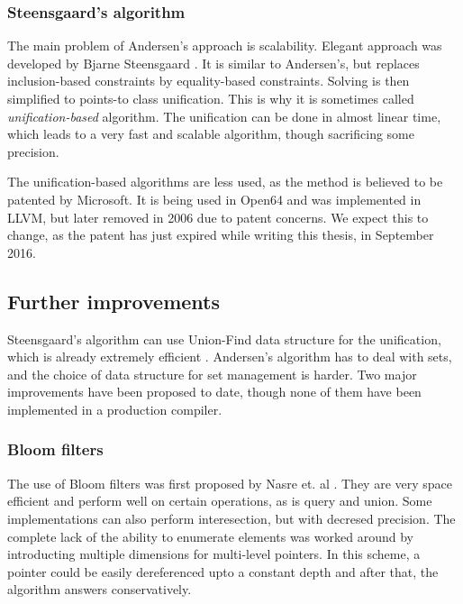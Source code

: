 \subsubsection{Steensgaard's algorithm}

The main problem of Andersen's approach is scalability. 
Elegant approach was developed by Bjarne Steensgaard \cite{Steensgaard96}. 
It is similar to Andersen's, but replaces inclusion-based constraints by
equality-based constraints. Solving is then simplified to points-to class
unification. This is why it is sometimes called {\it unification-based}
algorithm. The unification can be done in almost linear time, which leads to a
very fast and scalable algorithm, though sacrificing some precision.

The unification-based algorithms are less used, as the method is
believed to be patented by Microsoft\cite{patent:steensgaard}. It is being used
in Open64 and was implemented in LLVM, but later removed in 2006
\cite{LLVM:DSA:Remove} due to patent concerns. We expect this to change, as the
patent has just expired while writing this thesis, in September 2016.

\subsection{Further improvements}

Steensgaard's algorithm can use Union-Find data structure for the unification,
which is already extremely efficient \cite{Tarjan1975}. Andersen's algorithm has
to deal with sets, and the choice of data structure for set management is
harder. Two major improvements have been proposed to date, though none of them
have been implemented in a production compiler.

\subsubsection{Bloom filters}

The use of Bloom filters was first proposed by Nasre et. al \cite{nasre2009}.
They are very space efficient and perform well on certain operations, as is
query and union. Some implementations can also perform interesection, but with
decresed precision. The complete lack of the ability to enumerate elements was
worked around by introducting multiple dimensions for multi-level pointers. In
this scheme, a pointer could be easily dereferenced upto a constant depth and
after that, the algorithm answers conservatively.

